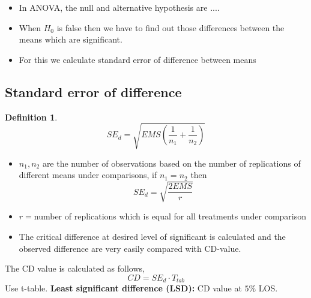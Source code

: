 \documentclass[oneside,11pt,pdftex]{book}%
\numberwithin{equation}{section}
\newtheorem{definition}[theorem]{Definition}
\numberwithin{section}{chapter}
\numberwithin{equation}{chapter}
\begin{document}
\begin{itemize}
	\item In ANOVA, the null and alternative hypothesis are ....
	\item When $ H_0 $ is false then we have to find out those differences between the means which are significant.
	\item For this we calculate standard error of difference between means
\end{itemize}

\subsection{Standard error of difference}
\begin{definition}
	\[ SE_d=\sqrt{EMS\left(\frac{1}{n_1}+\frac{1}{n_2}\right)} \]
\end{definition}
\begin{itemize}
	\item $ n_1 , n_2$ are the number of observations based on the number of replications of different means under comparisons, if $ n_1=n_2$ then 
	\[ SE_d=\sqrt{\frac{2 EMS}{r}} \]
	\item $ r= $number of replications which is equal for all treatments under comparison
	\item The critical difference at desired level of significant is calculated and the observed difference are very easily compared with CD-value.
\end{itemize}
The CD value is calculated as follows,
\[ CD=SE_d \cdot T_{tab} \]
Use t-table.
\textbf{Least significant difference (LSD):} CD value at $ 5 \% $ LOS.
\end{document}
